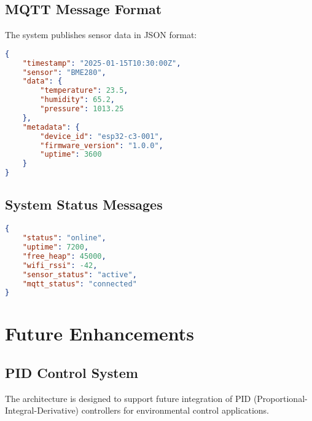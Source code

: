 \documentclass[12pt,a4paper]{article}
\begin{document}
\subsection{MQTT Message Format}

The system publishes sensor data in JSON format:

\begin{lstlisting}[language=json, caption={Sensor Data Message}]
{
    "timestamp": "2025-01-15T10:30:00Z",
    "sensor": "BME280",
    "data": {
        "temperature": 23.5,
        "humidity": 65.2,
        "pressure": 1013.25
    },
    "metadata": {
        "device_id": "esp32-c3-001",
        "firmware_version": "1.0.0",
        "uptime": 3600
    }
}
\end{lstlisting}

\subsection{System Status Messages}

\begin{lstlisting}[language=json, caption={System Status Message}]
{
    "status": "online",
    "uptime": 7200,
    "free_heap": 45000,
    "wifi_rssi": -42,
    "sensor_status": "active",
    "mqtt_status": "connected"
}
\end{lstlisting}

\section{Future Enhancements}

\subsection{PID Control System}

The architecture is designed to support future integration of PID (Proportional-Integral-Derivative) controllers for environmental control applications.
\end{document}
